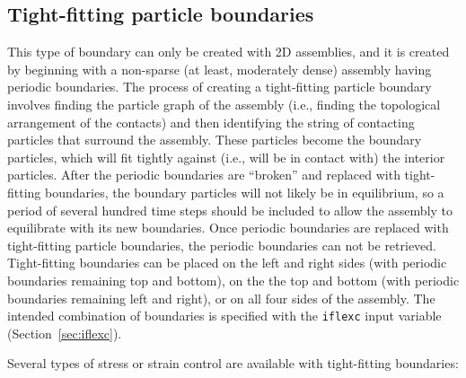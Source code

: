 \documentclass[letterpaper,11pt]{article}
\begin{document}
\subsection{Tight-fitting particle boundaries}\label{sec:TightFitting}
This type of boundary can only be created with 2D assemblies,
and it is created by beginning with a non-sparse (at least, moderately
dense) assembly having periodic boundaries.
The process of creating a tight-fitting particle boundary involves
finding the particle graph of the assembly (i.e., finding the
topological arrangement of the contacts) and then identifying the string
of contacting particles that surround the assembly.
These particles become the boundary particles, which will fit tightly
against (i.e., will be in contact with) the interior particles.
After the periodic boundaries are ``broken'' and replaced with
tight-fitting boundaries, the boundary particles will not likely be
in equilibrium, so a period of several hundred time steps should be
included to allow the assembly to equilibrate with its new boundaries.
Once periodic boundaries are replaced with tight-fitting particle boundaries,
the periodic boundaries can not be retrieved.
Tight-fitting boundaries can be placed on the left and right sides (with
periodic boundaries remaining top and bottom), on the the top and bottom
(with periodic boundaries remaining left and right), or on all four sides
of the assembly.  The intended combination of boundaries is specified
with the \texttt{iflexc} input variable (Section~\ref{sec:iflexc}).
\par
Several types of stress or strain control are available with tight-fitting
boundaries:
\end{document}
